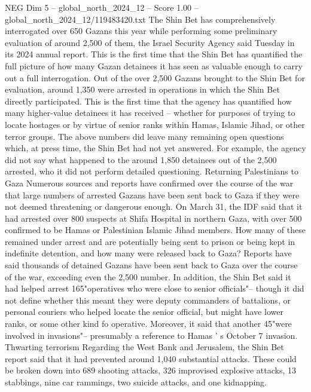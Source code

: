 \begin{textsample}{NEG Dim 5 – global\_north\_2024\_12 – Score 1.00 – global\_north\_2024\_12/119483420.txt}  \label{ex:f5_neg_360}
The Shin Bet has comprehensively interrogated over 650 Gazans this year while performing some preliminary evaluation of around 2,500 of them, the Israel Security Agency said Tuesday in its 2024 annual report.
This is the first time that the Shin Bet has quantified the full picture of how many Gazan detainees it has seen as valuable enough to carry out a full interrogation.
Out of the over 2,500 Gazans brought to the Shin Bet for evaluation, around 1,350 were arrested in operations in which the Shin Bet directly participated.
This is the first time that the agency has quantified how many higher-value detainees it has received -- whether for purposes of trying to locate hostages or by virtue of senior ranks within Hamas, Islamic Jihad, or other terror groups.
The above numbers did leave many remaining open questions which, at press time, the Shin Bet had not yet answered.
For example, the agency did not say what happened to the around 1,850 detainees out of the 2,500 arrested, who it did not perform detailed questioning.
Returning Palestinians to Gaza Numerous sources and reports have confirmed over the course of the war that large numbers of arrested Gazans have been sent back to Gaza if they were not deemed threatening or dangerous enough.
On March 31, the IDF said that it had arrested over 800 suspects at Shifa Hospital in northern Gaza, with over 500 confirmed to be Hamas or Palestinian Islamic Jihad members.
How many of these remained under arrest and are potentially being sent to prison or being kept in indefinite detention, and how many were released back to Gaza?
Reports have said thousands of detained Gazans have been sent back to Gaza over the course of the war, exceeding even the 2,500 number.
In addition, the Shin Bet said it had helped arrest 165"operatives who were close to senior officials"-- though it did not define whether this meant they were deputy commanders of battalions, or personal couriers who helped locate the senior official, but might have lower ranks, or some other kind fo operative.
Moreover, it said that another 45"were involved in invasions"-- presumably a reference to Hamas ' s October 7 invasion.
Thwarting terrorism Regarding the West Bank and Jerusalem, the Shin Bet report said that it had prevented around 1,040 substantial attacks.
These could be broken down into 689 shooting attacks, 326 improvised explosive attacks, 13 stabbings, nine car rammings, two suicide attacks, and one kidnapping.

\end{textsample}
